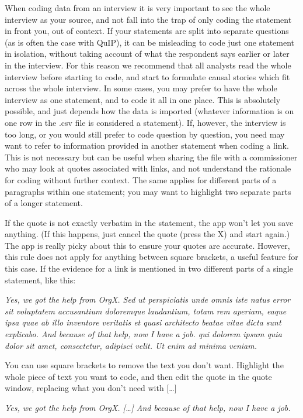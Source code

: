 \documentclass[
]{book}
\begin{document}
When coding data from an interview it is very important to see the whole interview as your source, and not fall into the trap of only coding the statement in front you, out of context. If your statements are split into separate questions (as is often the case with QuIP), it can be misleading to code just one statement in isolation, without taking account of what the respondent says earlier or later in the interview. For this reason we recommend that all analysts read the whole interview before starting to code, and start to formulate causal stories which fit across the whole interview. In some cases, you may prefer to have the whole interview as one statement, and to code it all in one place. This is absolutely possible, and just depends how the data is imported (whatever information is on one row in the .csv file is considered a statement). If, however, the interview is too long, or you would still prefer to code question by question, you need may want to refer to information provided in another statement when coding a link. This is not necessary but can be useful when sharing the file with a commissioner who may look at quotes associated with links, and not understand the rationale for coding without further context. The same applies for different parts of a paragraphs within one statement; you may want to highlight two separate parts of a longer statement.

If the quote is not exactly verbatim in the statement, the app won't let you save anything. (If this happens, just cancel the quote (press the X) and start again.) The app is really picky about this to ensure your quotes are accurate. However, this rule does not apply for anything between square brackets, a useful feature for this case. If the evidence for a link is mentioned in two different parts of a single statement, like this:

\emph{Yes, we got the help from OrgX. Sed ut perspiciatis unde omnis iste natus error sit voluptatem accusantium doloremque laudantium, totam rem aperiam, eaque ipsa quae ab illo inventore veritatis et quasi architecto beatae vitae dicta sunt explicabo. And because of that help, now I have a job. qui dolorem ipsum quia dolor sit amet, consectetur, adipisci velit. Ut enim ad minima veniam.}

You can use square brackets to remove the text you don't want. Highlight the whole piece of text you want to code, and then edit the quote in the quote window, replacing what you don't need with {[}\ldots{]}

\emph{Yes, we got the help from OrgX. {[}\ldots{]} And because of that help, now I have a job.}
\end{document}
